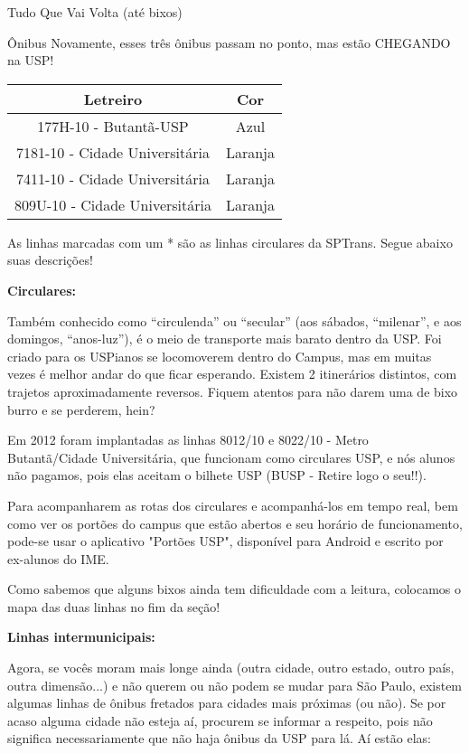\begin{secao}{Tudo Que Vai Volta (até bixos)}
\begin{subsecao}{Ônibus}
Novamente, esses três ônibus passam no ponto, mas estão CHEGANDO na USP!
\begin{center}
	\begin{tabular}{|c|c|}
	  \hline
	  Letreiro & Cor\\
	  \hline
	  177H-10 - Butantã-USP & Azul\\
	  7181-10 - Cidade Universitária & Laranja\\
	  7411-10 - Cidade Universitária & Laranja\\
	  809U-10 - Cidade Universitária & Laranja\\
	  \hline
	\end{tabular}
\end{center}

As linhas marcadas com um * são as linhas circulares da SPTrans. Segue abaixo suas descrições!

{\bf Circulares:}

Também conhecido como ``circulenda'' ou ``secular'' (aos sábados, ``milenar'',
e aos domingos, ``anos-luz''), é o meio de transporte mais barato dentro da USP.
Foi criado para os USPianos se locomoverem dentro do Campus, mas em muitas vezes
é melhor andar do que ficar esperando. Existem 2 itinerários distintos, com
trajetos aproximadamente reversos. Fiquem atentos para não darem uma de bixo
burro e se perderem, hein?

Em 2012 foram implantadas as linhas 8012/10 e 8022/10 - Metro Butantã/Cidade Universitária,
que funcionam como circulares USP, e nós alunos não pagamos, pois elas aceitam
o bilhete USP (BUSP - Retire logo o seu!!).

Para acompanharem as rotas dos circulares e acompanhá-los em tempo real, bem como
ver os portões do campus que estão abertos e seu horário de funcionamento, pode-se
usar o aplicativo "Portões USP", disponível para Android e escrito por ex-alunos
do IME.

Como sabemos que alguns bixos ainda tem dificuldade com a leitura, colocamos o
 mapa das duas linhas no fim da seção!


{\bf Linhas intermunicipais:}

Agora, se vocês moram mais longe ainda (outra cidade, outro estado, outro país,
outra dimensão...) e não querem ou não podem se mudar para São Paulo, existem
algumas linhas de ônibus fretados para cidades mais próximas (ou não). Se por
acaso alguma cidade não esteja aí, procurem se informar a respeito, pois não significa
necessariamente que não haja ônibus da USP para lá. Aí estão elas:


\end{subsecao}
\end{secao}
